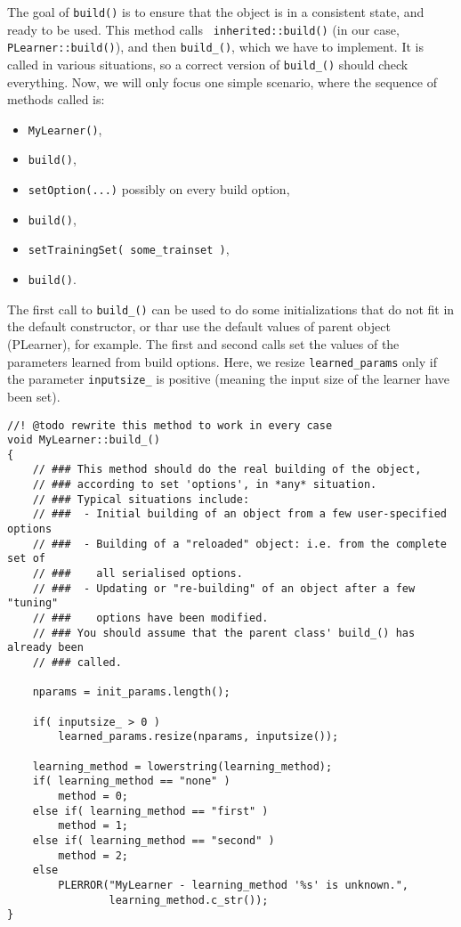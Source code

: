 \documentclass[11pt]{book}
\begin{document}
\begin{enumerate}
The goal of {\tt build()} is to ensure that the object is in a
consistent state, and ready to be used. This method calls {\tt
inherited::build()} (in our case, {\tt PLearner::build()}), and then
{\tt build\_()}, which we have to implement. It is called in various
situations, so a correct version of {\tt build\_()} should check
everything. Now, we will only focus one simple scenario, where the
sequence of methods called is:
\begin{itemize}
  \item {\tt MyLearner()},
  \item {\tt build()},
  \item {\tt setOption(...)} possibly on every build option,
  \item {\tt build()},
  \item {\tt setTrainingSet( some\_trainset )},
  \item {\tt build()}.
\end{itemize}

The first call to {\tt build\_()} can be used to do some initializations
that do not fit in the default constructor, or thar use the default
values of parent object (PLearner), for example. The first and second
calls set the values of the parameters learned from build options. Here,
we resize {\tt learned\_params} only if the parameter {\tt inputsize\_}
is positive (meaning the input size of the learner have been set).

\begin{verbatim}
//! @todo rewrite this method to work in every case
void MyLearner::build_()
{
    // ### This method should do the real building of the object,
    // ### according to set 'options', in *any* situation.
    // ### Typical situations include:
    // ###  - Initial building of an object from a few user-specified options
    // ###  - Building of a "reloaded" object: i.e. from the complete set of
    // ###    all serialised options.
    // ###  - Updating or "re-building" of an object after a few "tuning"
    // ###    options have been modified.
    // ### You should assume that the parent class' build_() has already been
    // ### called.

    nparams = init_params.length();

    if( inputsize_ > 0 )
        learned_params.resize(nparams, inputsize());

    learning_method = lowerstring(learning_method);
    if( learning_method == "none" )
        method = 0;
    else if( learning_method == "first" )
        method = 1;
    else if( learning_method == "second" )
        method = 2;
    else
        PLERROR("MyLearner - learning_method '%s' is unknown.",
                learning_method.c_str());
}
\end{verbatim}


\end{enumerate}
\end{document}
